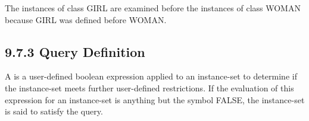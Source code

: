 \documentclass[letterpaper,10pt,english]{sphinxmanual}
\begin{document}
\begin{sphinxVerbatim}[commandchars=\\\{\}]
 \PYG{p}{[}\PYG{p}{]} \PYG{p}{[}\PYG{p}{]}  \PYG{p}{[}\PYG{p}{]} \PYG{p}{[}\PYG{p}{]}
 \PYG{p}{[}\PYG{p}{]} \PYG{p}{[}\PYG{p}{]}  \PYG{p}{[}\PYG{p}{]} \PYG{p}{[}\PYG{p}{]}
\PYG{p}{[}\PYG{p}{]} \PYG{p}{[}\PYG{p}{]}  \PYG{p}{[}\PYG{p}{]} \PYG{p}{[}\PYG{p}{]}
\PYG{p}{[}\PYG{p}{]} \PYG{p}{[}\PYG{p}{]}  \PYG{p}{[}\PYG{p}{]} \PYG{p}{[}\PYG{p}{]}
\PYG{p}{[}\PYG{p}{]} \PYG{p}{[}\PYG{p}{]}  \PYG{p}{[}\PYG{p}{]} \PYG{p}{[}\PYG{p}{]}
\PYG{p}{[}\PYG{p}{]} \PYG{p}{[}\PYG{p}{]}
 
\end{sphinxVerbatim}

The instances of class GIRL are examined before the instances of class
WOMAN because GIRL was defined before WOMAN.


\subsection{9.7.3 Query Definition}
\label{\detokenize{cool:query-definition}}
A  is a user-defined boolean expression applied to an
instance-set to determine if the instance-set meets further user-defined
restrictions. If the evaluation of this expression for an instance-set
is anything but the symbol FALSE, the instance-set is said to satisfy
the query.
\end{document}
